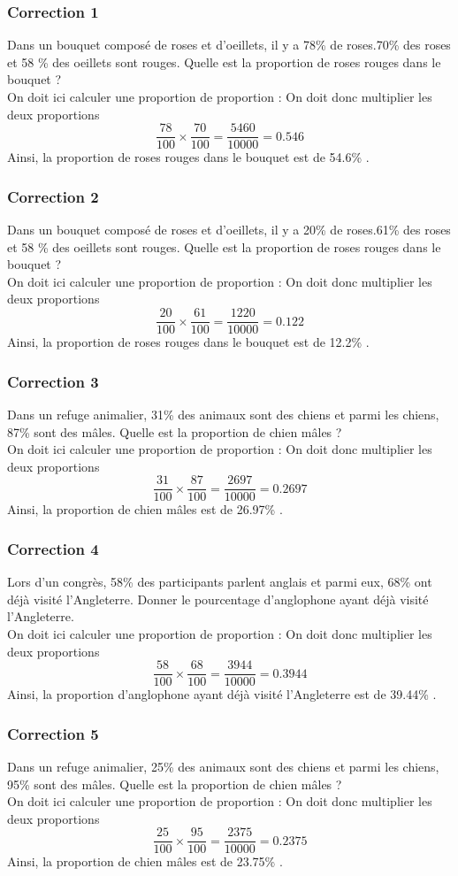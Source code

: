 \documentclass[15pt, mathserif]{beamer}
\begin{document}
\begin{frame}
\vspace{-10mm}
	\frametitle{Correction 1}
Dans un bouquet composé de roses et d'oeillets, il y a 78\% de roses.70\% des roses et 58 \% des oeillets sont rouges. Quelle est la proportion de roses rouges dans le bouquet ? \\ On doit ici calculer une proportion de proportion : On doit donc multiplier les deux proportions $$ \dfrac{78}{100} \times \dfrac{70}{100} = \dfrac{5460}{10000} = 0.546$$ Ainsi, la proportion de roses rouges dans le bouquet est de 54.6\% .\end{frame}


\begin{frame}
\vspace{-10mm}
	\frametitle{Correction 2}
Dans un bouquet composé de roses et d'oeillets, il y a 20\% de roses.61\% des roses et 58 \% des oeillets sont rouges. Quelle est la proportion de roses rouges dans le bouquet ? \\ On doit ici calculer une proportion de proportion : On doit donc multiplier les deux proportions $$ \dfrac{20}{100} \times \dfrac{61}{100} = \dfrac{1220}{10000} = 0.122$$ Ainsi, la proportion de roses rouges dans le bouquet est de 12.2\% .\end{frame}


\begin{frame}
\vspace{-10mm}
	\frametitle{Correction 3}
Dans un refuge animalier, 31\% des animaux sont des chiens et parmi les chiens, 87\% sont des mâles.  Quelle est la proportion de chien mâles ? \\ On doit ici calculer une proportion de proportion : On doit donc multiplier les deux proportions $$ \dfrac{31}{100} \times \dfrac{87}{100} = \dfrac{2697}{10000} = 0.2697$$ Ainsi, la proportion de chien mâles est de 26.97\% .\end{frame}


\begin{frame}
\vspace{-10mm}
	\frametitle{Correction 4}
Lors d'un congrès, 58\% des participants parlent anglais et parmi eux, 68\% ont déjà visité l'Angleterre. Donner le pourcentage d'anglophone ayant déjà visité l'Angleterre. \\ On doit ici calculer une proportion de proportion : On doit donc multiplier les deux proportions $$ \dfrac{58}{100} \times \dfrac{68}{100} = \dfrac{3944}{10000} = 0.3944$$ Ainsi, la proportion d'anglophone ayant déjà visité l'Angleterre est de 39.44\% .\end{frame}


\begin{frame}
\vspace{-10mm}
	\frametitle{Correction 5}
Dans un refuge animalier, 25\% des animaux sont des chiens et parmi les chiens, 95\% sont des mâles.  Quelle est la proportion de chien mâles ? \\ On doit ici calculer une proportion de proportion : On doit donc multiplier les deux proportions $$ \dfrac{25}{100} \times \dfrac{95}{100} = \dfrac{2375}{10000} = 0.2375$$ Ainsi, la proportion de chien mâles est de 23.75\% .\end{frame}
\end{document}
